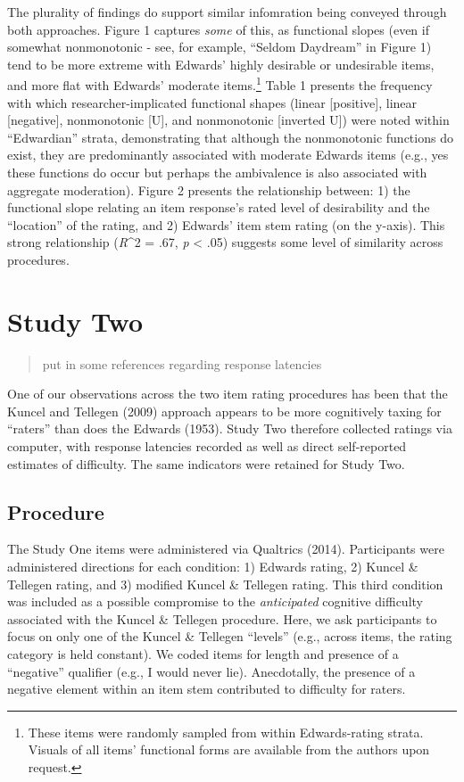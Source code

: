 \documentclass[
  ,man]{apa6}
\begin{document}
The plurality of findings do support similar infomration being conveyed through both approaches. Figure 1 captures \emph{some} of this, as functional slopes (even if somewhat nonmonotonic - see, for example, ``Seldom Daydream'' in Figure 1) tend to be more extreme with Edwards' highly desirable or undesirable items, and more flat with Edwards' moderate items.\footnote{These items were randomly sampled from within Edwards-rating strata. Visuals of all items' functional forms are available from the authors upon request.} Table 1 presents the frequency with which researcher-implicated functional shapes (linear {[}positive{]}, linear {[}negative{]}, nonmonotonic {[}U{]}, and nonmonotonic {[}inverted U{]}) were noted within ``Edwardian'' strata, demonstrating that although the nonmonotonic functions do exist, they are predominantly associated with moderate Edwards items (e.g., yes these functions do occur but perhaps the ambivalence is also associated with aggregate moderation). Figure 2 presents the relationship between: 1) the functional slope relating an item response's rated level of desirability and the ``location'' of the rating, and 2) Edwards' item stem rating (on the y-axis). This strong relationship (\emph{R}\^{}2 = .67, \emph{p} \textless{} .05) suggests some level of similarity across procedures.

\hypertarget{study-two}{%
\section{Study Two}\label{study-two}}

\begin{quote}
put in some references regarding response latencies
\end{quote}

One of our observations across the two item rating procedures has been that the Kuncel and Tellegen (2009) approach appears to be more cognitively taxing for ``raters'' than does the Edwards (1953). Study Two therefore collected ratings via computer, with response latencies recorded as well as direct self-reported estimates of difficulty. The same indicators were retained for Study Two.

\hypertarget{procedure-1}{%
\subsection{Procedure}\label{procedure-1}}

The Study One items were administered via Qualtrics (2014). Participants were administered directions for each condition: 1) Edwards rating, 2) Kuncel \& Tellegen rating, and 3) modified Kuncel \& Tellegen rating. This third condition was included as a possible compromise to the \emph{anticipated} cognitive difficulty associated with the Kuncel \& Tellegen procedure. Here, we ask participants to focus on only one of the Kuncel \& Tellegen ``levels'' (e.g., across items, the rating category is held constant). We coded items for length and presence of a ``negative'' qualifier (e.g., I would never lie). Anecdotally, the presence of a negative element within an item stem contributed to difficulty for raters.
\end{document}
